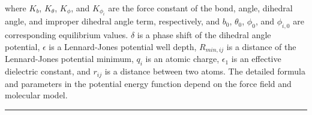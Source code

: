 \documentclass[a4paper,11pt,oneside,english]{sphinxmanual}
\begin{document}
where \(K_b\), \(K_{\theta}\), \(K_{\phi}\),
and \(K_{\phi_i}\) are the force constant of the bond, angle,
dihedral angle, and improper dihedral angle term, respectively, and
\(b_0\), \(\theta_0\), \(\phi_0\), and \(\phi_{i,0}\)
are corresponding equilibrium values.
\(\delta\) is a phase shift of the dihedral angle potential,
\(\epsilon\) is a Lennard-Jones potential well depth,
\(R_{min,ij}\) is a distance of the Lennard-Jones potential minimum,
\(q_i\) is an atomic charge, \(\epsilon_1\) is an effective
dielectric constant, and \(r_{ij}\) is a distance between two atoms.
The detailed formula and parameters in the potential energy function
depend on the force field and molecular model.


\bigskip\hrule\bigskip


 
\end{document}
